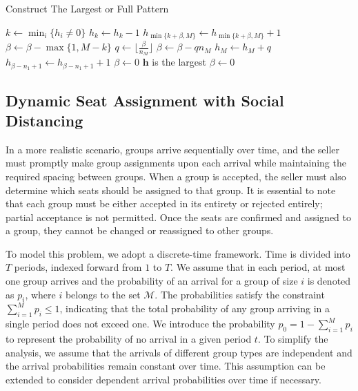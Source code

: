 \begin{algorithm}
  \caption{Construct The Largest or Full Pattern}\label{construction}
    {$k \gets \min_{i}\{h_{i} \neq 0\}$
    {$h_{k} \gets h_{k} - 1$\; $h_{\min\{k+\beta, M\}} \gets h_{\min\{k+\beta, M\}} + 1$\;
    $\beta \gets \beta - \max\{1, M - k\}$}
    {
    {$q \gets \lfloor\frac{\beta}{n_M}\rfloor$\;
     $\beta \gets \beta - q n_M$\; $h_{M} \gets h_{M} + q$}
    {
    {$h_{\beta-n_1+1} \gets h_{\beta-n_1+1} + 1$\; $\beta \gets 0$\;}
    {$\bm{h}$ is the largest\; $\beta \gets 0$\;}}
    }}
\end{algorithm}


\subsection{Dynamic Seat Assignment with Social Distancing}\label{sec_dynamic_seat}
In a more realistic scenario, groups arrive sequentially over time, and the seller must promptly make group assignments upon each arrival while maintaining the required spacing between groups. When a group is accepted, the seller must also determine which seats should be assigned to that group. It is essential to note that each group must be either accepted in its entirety or rejected entirely; partial acceptance is not permitted. Once the seats are confirmed and assigned to a group, they cannot be changed or reassigned to other groups.

To model this problem, we adopt a discrete-time framework. Time is divided into $T$ periods, indexed forward from $1$ to $T$. We assume that in each period, at most one group arrives and the probability of an arrival for a group of size $i$ is denoted as $p_i$, where $i$ belongs to the set $\mathcal{M}$. The probabilities satisfy the constraint $\sum_{i=1}^M p_i \leq 1$, indicating that the total probability of any group arriving in a single period does not exceed one. We introduce the probability $p_0 = 1 - \sum_{i=1}^{M} p_i$ to represent the probability of no arrival in a given period $t$. To simplify the analysis, we assume that the arrivals of different group types are independent and the arrival probabilities remain constant over time. This assumption can be extended to consider dependent arrival probabilities over time if necessary.

